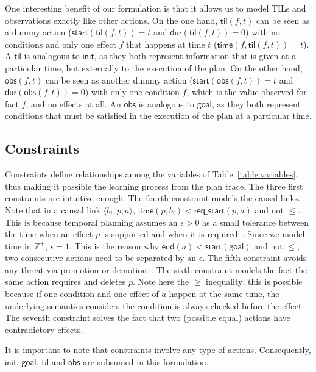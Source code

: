 \documentclass[runningheads]{llncs}
\newcommand{\tup}[1]{{\langle #1 \rangle}}
\newcommand{\dur}{\mathsf{dur}}    %
\newcommand{\obs}{\mathsf{obs}}    %
\newcommand{\start}{\mathsf{start}}%
\newcommand{\en}{\mathsf{end}}     %
\newcommand{\til}{\mathsf{til}}    %
\newcommand{\tim}{\mathsf{time}}   %
\newcommand{\reqs}{\mathsf{req\_{start}}} %
\newcommand{\ini}{\mathsf{init}}   %
\newcommand{\goal}{\mathsf{goal}}  %
\begin{document}
One interesting benefit of our formulation is that it allows us to model TILs and observations exactly like other actions. On the one hand, $\til(f,t)$ can be seen as a dummy action ($\start(\til(f,t))=t$ and $\dur(\til(f,t))=0$) with no conditions and only one effect $f$ that happens at time $t$ ($\tim(f,\til(f,t))=t$). A $\til$ is analogous to $\ini$, as they both represent information that is given at a particular time, but externally to the execution of the plan.
On the other hand, $\obs(f,t)$ can be seen as another dummy action ($\start(\obs(f,t))=t$ and $\dur(\obs(f,t))=0$) with only one condition $f$, which is the value observed for fact $f$, and no effects at all. An $\obs$ is analogous to $\goal$, as they both represent conditions that must be satisfied in the execution of the plan at a particular time.



\subsection{Constraints}

Constraints define relationships among the variables of Table~\ref{table:variables}, thus making it possible the learning process from the plan trace.
The three first constraints are intuitive enough. The fourth constraint models the causal links. Note that in a causal link $\tup{b_i,p,a}$, $\tim(p,b_i) < \reqs(p,a)$ and not $\leq$. This is because temporal planning assumes an $\epsilon > 0$ as a small tolerance between the time when an effect $p$ is supported and when it is required~\cite{fox2003pddl2}. Since we model time in $\mathbb{Z}^+$, $\epsilon=1$. This is the reason why $\en(a) < \start(\goal)$ and not $\leq$; two consecutive actions need to be separated by an $\epsilon$.
The fifth constraint avoids any threat via promotion or demotion~\cite{ghallab2004automated}. The sixth constraint models the fact the same action requires and deletes $p$. Note here the $\geq$ inequality; this is possible because if one condition and one effect of $a$ happen at the same time, the underlying semantics considers the condition is always checked before the effect. The seventh constraint solves the fact that two (possible equal) actions have contradictory effects.

It is important to note that constraints involve any type of actions. Consequently, $\ini$, $\goal$, $\til$ and $\obs$ are subsumed in this formulation.
\end{document}
